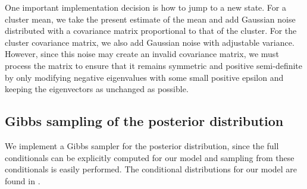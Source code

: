 \documentclass[twoside]{article}
\theoremstyle{theorem}
\theoremstyle{theorem}
\theoremstyle{theorem}
\theoremstyle{lemma}
\theoremstyle{definition}
\theoremstyle{example}
\begin{document}
One important implementation decision is how to jump to a new state. For a cluster mean, we take the present estimate of the mean and add Gaussian noise distributed with a covariance matrix proportional to that of the cluster. For the cluster covariance matrix, we also add Gaussian noise with adjustable variance. However, since this noise may create an invalid covariance matrix, we must process the matrix to ensure that it remains symmetric and positive semi-definite by only modifying negative eigenvalues with some small positive epsilon and keeping the eigenvectors as unchanged as possible.

\subsection{Gibbs sampling of the posterior distribution}
We implement a Gibbs sampler for the posterior distribution, since the full conditionals can be explicitly computed for our model and sampling from these conditionals is easily performed. 
The conditional distributions for our model are found in \cite{Gelman, Jones}. 
\end{document}
